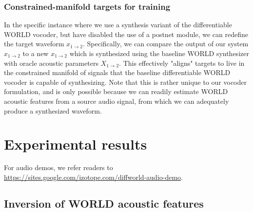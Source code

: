 \documentclass{article}
\begin{document}
\begin{sloppy}
\subsubsection{Constrained-manifold targets for training}
\label{sssec:manifold}
In the specific instance where we use a synthesis variant of the differentiable WORLD vocoder, but have disabled the use of a postnet module, we can redefine the target waveform $x_{1\rightarrow2}$.  Specifically, we can compare the output of our system $\hat{x}_{1\rightarrow2}$ to a new $x_{1\rightarrow2}$ which is synthesized using the baseline WORLD synthesizer with oracle acoustic parameters $X_{1\rightarrow2}$.  This effectively "aligns" targets to live in the constrained manifold of signals that the baseline differentiable WORLD vocoder is capable of synthesizing.  Note that this is rather unique to our vocoder formulation, and is only possible because we can readily estimate WORLD acoustic features from a source audio signal, from which we can adequately produce a synthesized waveform.

\section{Experimental results}
\label{sec:results}

For audio demos, we refer readers to \href{https://sites.google.com/izotope.com/diffworld-audio-demo}{https://sites.google.com/izotope.com/diffworld-audio-demo}.

\subsection{Inversion of WORLD acoustic features}


\end{sloppy}
\end{document}
